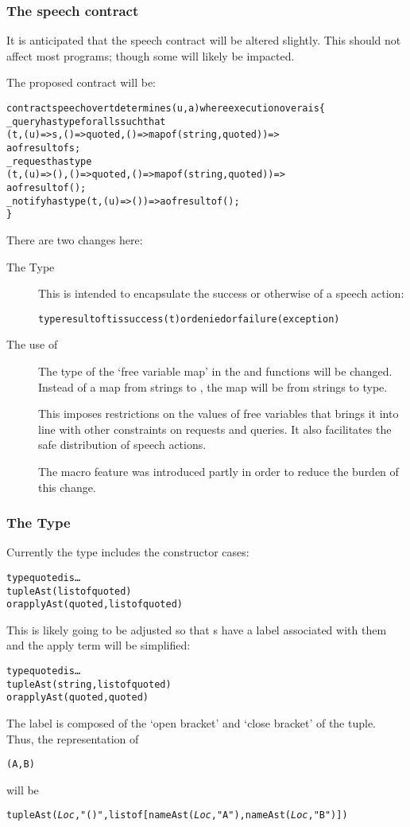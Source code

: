 \subsubsection{The speech contract}
It is anticipated that the speech contract will be altered slightly. This should not affect most programs; though some will likely be impacted.

The proposed contract will be:
\begin{alltt}
contract speech over t determines (u,a) where execution over a is \{
  _query has type for all s such that 
         (t,(u)=>s,()=>quoted,()=>map of (string,quoted))=>
            a of result of s;
  _request has type
         (t,(u)=>(),()=>quoted,()=>map of (string,quoted)) => 
            a of result of ();
  _notify has type (t,(u)=>()) => a of result of ();
\}
\end{alltt}
There are two changes here: 
\begin{description}
\item[The  Type]
This is intended to encapsulate the success or otherwise of a speech action:
\begin{alltt}
type result of t is success(t) or denied or failure(exception)
\end{alltt}

\item[The use of ]
The type of the `free variable map' in the  and  functions will be changed. Instead of a map from strings to , the map will be from strings to  type.

This imposes restrictions on the values of free variables that brings it into line with other constraints on requests and queries. It also facilitates the safe distribution of speech actions.

The  macro feature was introduced partly in order to reduce the burden of this change.
\end{description}

\subsubsection{The  Type}
Currently the  type includes the constructor cases:
\begin{alltt}
type quoted is \ldots
     tupleAst(list of quoted)
  or applyAst(quoted,list of quoted)
\end{alltt}
This is likely going to be adjusted so that s have a label associated with them and the apply term will be simplified:
\begin{alltt}
type quoted is \ldots
     tupleAst(string,list of quoted)
  or applyAst(quoted,quoted)
\end{alltt}
The label is composed of the `open bracket' and `close bracket' of the tuple. Thus, the representation of
\begin{alltt}
(A,B)
\end{alltt}
will be
\begin{alltt}
tupleAst(\emph{Loc},"()",list of [nameAst(\emph{Loc},"A"), nameAst(\emph{Loc},"B")])
\end{alltt}

